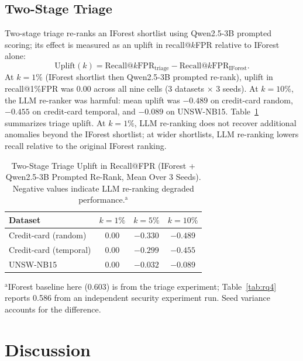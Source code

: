\documentclass[conference]{IEEEtran}
\begin{document}
\subsection{Two-Stage Triage}\label{subsec:triage}
Two-stage triage re-ranks an IForest shortlist using Qwen2.5-3B prompted scoring; its effect is measured as an uplift in recall@$k$FPR relative to IForest alone:
\begin{equation}
\text{Uplift}(k)=\text{Recall@}k\text{FPR}_{\text{triage}}-\text{Recall@}k\text{FPR}_{\text{IForest}}.
\end{equation}
At $k=1\%$ (IForest shortlist then Qwen2.5-3B prompted re-rank), uplift in recall@1\%FPR was 0.00 across all nine cells (3 datasets $\times$ 3 seeds).
At $k=10\%$, the LLM re-ranker was harmful: mean uplift was $-0.489$ on credit-card random, $-0.455$ on credit-card temporal, and $-0.089$ on UNSW-NB15.
Table~\ref{tab:rq7} summarizes triage uplift.
At $k=1\%$, LLM re-ranking does not recover additional anomalies beyond the IForest shortlist; at wider shortlists, LLM re-ranking lowers recall relative to the original IForest ranking.

\begin{table}[htbp]
\caption{Two-Stage Triage Uplift in Recall@FPR (IForest + Qwen2.5-3B Prompted Re-Rank, Mean Over 3 Seeds). Negative values indicate LLM re-ranking degraded performance.$^{\mathrm{a}}$}
\label{tab:rq7}
\begin{center}
\renewcommand{\arraystretch}{1.2}
\begin{tabular}{|l|c|c|c|}
\hline
\textbf{Dataset} & \textbf{$k=1\%$} & \textbf{$k=5\%$} & \textbf{$k=10\%$} \\
\hline
Credit-card (random)   & 0.00 & $-0.330$ & $-0.489$ \\
Credit-card (temporal) & 0.00 & $-0.299$ & $-0.455$ \\
UNSW-NB15              & 0.00 & $-0.032$ & $-0.089$ \\
\hline
\end{tabular}
\par\smallskip\footnotesize $^{\mathrm{a}}$IForest baseline here (0.603) is from the triage experiment; Table~\ref{tab:rq4} reports 0.586 from an independent security experiment run. Seed variance accounts for the difference.
\end{center}
\end{table}

\section{Discussion}\label{sec:discussion}
\end{document}
